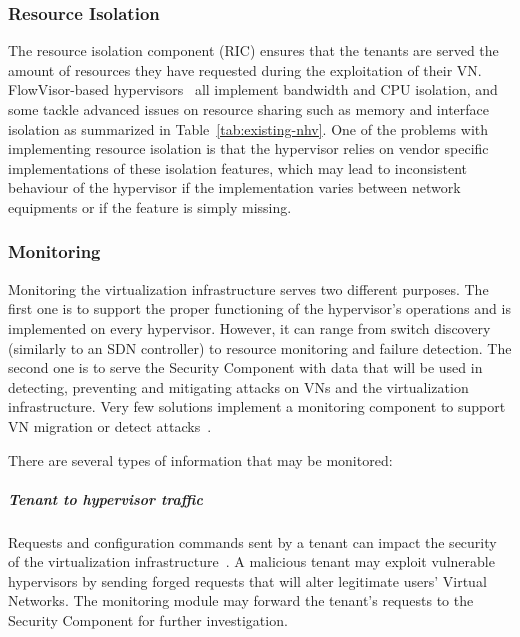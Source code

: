 \subsubsection{Resource Isolation}
The resource isolation component (RIC) ensures that the tenants are served the amount of resources they have requested during the exploitation of their VN.
FlowVisor-based hypervisors~\cite{FlowVisor-Sherwood2009,ADVisor-Salvadori2012,VeRTIGO-Corin2012a,EnhancedFV-Min2012,SlicesIsolator-El-Azzab2011,DoubleFV-Yin2013} all implement bandwidth and CPU isolation, and some tackle advanced issues on resource sharing such as memory and interface isolation as summarized in Table~\ref{tab:existing-nhv}. One of the problems with implementing resource isolation is that the hypervisor relies on vendor specific implementations of these isolation features, which may lead to inconsistent behaviour of the hypervisor if the implementation varies between network equipments or if the feature is simply missing.


\subsubsection{Monitoring}
Monitoring the virtualization infrastructure serves two different purposes.
The first one is to support the proper functioning of the hypervisor's operations and is implemented on every hypervisor. However, it can range from switch discovery (similarly to an SDN controller) to resource monitoring and failure detection.
The second one is to serve the Security Component with data that will be used in detecting, preventing and mitigating attacks on VNs and the virtualization infrastructure.
Very few solutions implement a monitoring component to support VN migration or detect attacks~\cite{VeRTIGO-Corin2012a,CoVisor-Jin2015,FlowN-Drutskoy2012,AutoSlice-Bozakov2012,NVP-Koponen2014,ONVisor-Han2018}.

There are several types of information that may be monitored:

\subparagraph{Tenant to hypervisor traffic} Requests and configuration commands sent by a tenant can impact the security of the virtualization infrastructure~\cite{You2014,Costa2015}. A malicious tenant may exploit vulnerable hypervisors by sending forged requests that will alter legitimate users' Virtual Networks. The monitoring module may forward the tenant's requests to the Security Component for further investigation.

